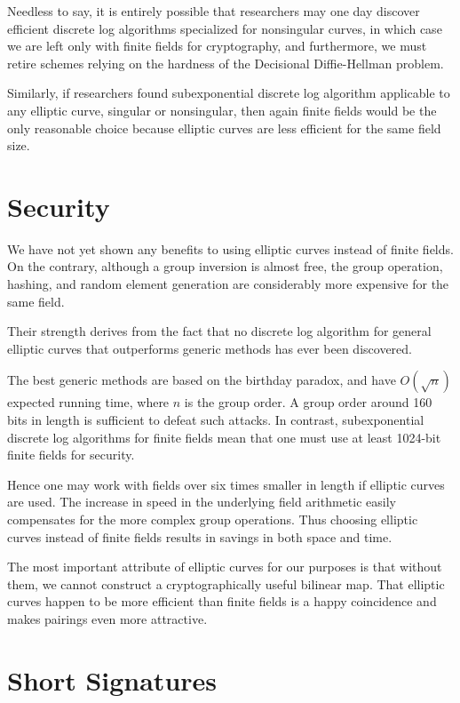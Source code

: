 Needless to say, it is entirely possible that researchers may one day discover
efficient discrete log algorithms specialized for nonsingular curves,
in which case we are left only with finite fields for cryptography, and
furthermore, we must retire schemes relying on the hardness of the Decisional
Diffie-Hellman problem.

Similarly, if researchers found subexponential discrete log algorithm
applicable to any elliptic curve, singular or nonsingular, then again finite
fields would be the only reasonable choice because elliptic curves are less
efficient for the same field size.

\section {\label{sec:eccsec}Security}

We have not yet shown any benefits to using elliptic curves instead of finite
fields. On the contrary, although a group inversion is almost free, the group
operation, hashing, and random element generation are considerably more
expensive for the same field.

Their strength derives from the fact that no discrete log algorithm for general
elliptic curves that outperforms generic methods has ever been discovered.

The best generic methods are based on the birthday paradox, and have
$O(\sqrt{n})$ expected running time, where $n$ is the group order. A group
order around 160 bits in length is sufficient to defeat such attacks. In
contrast, subexponential discrete log algorithms for finite fields mean that
one must use at least 1024-bit finite fields for security.

Hence one may work with fields over six times smaller in length if elliptic
curves are used. The increase in speed in the underlying field arithmetic
easily compensates for the more complex group operations. Thus choosing
elliptic curves instead of finite fields results in savings in both space and
time.

The most important attribute of elliptic curves for our purposes is that
without them, we cannot construct a cryptographically useful bilinear map. That
elliptic curves happen to be more efficient than finite fields is a happy
coincidence and makes pairings even more attractive.

\section {Short Signatures}

